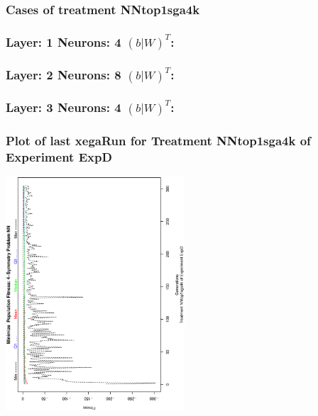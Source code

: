 \documentclass[18pt,c]{beamer}
\begin{document}
 \begin{frame}
 \fontsize{8pt}{9pt}\selectfont
 \frametitle{ Cases of treatment NNtop1sga4k }

 \label{ExpDSolutionTable006.tex}  
 \end{frame}


 \begin{frame}
 \fontsize{8pt}{9pt}\selectfont
 \frametitle{ Layer: 1 Neurons: 4  $(b|W)^T$: 
 }

 \label{ExpDNNWeightTable006.tex}  
 \end{frame}


 \begin{frame}
 \fontsize{8pt}{9pt}\selectfont
 \frametitle{ Layer: 2 Neurons: 8  $(b|W)^T$: 
 }

 \label{ExpDNNWeightTable007.tex}  
 \end{frame}


 \begin{frame}
 \fontsize{8pt}{9pt}\selectfont
 \frametitle{ Layer: 3 Neurons: 4  $(b|W)^T$: 
 }

 \label{ExpDNNWeightTable008.tex}  
 \end{frame}

 \begin{frame}
 \frametitle{ Plot of last xegaRun for Treatment NNtop1sga4k of Experiment ExpD }
 \begin{center}
\includegraphics[width=0.5\textwidth, angle=-90]
{ExpDPlotPopStatsFigure002.eps}
 \end{center}
 \label{report/ExpDPlotPopStatsFigure002.eps}  
 \end{frame}
\end{document}
